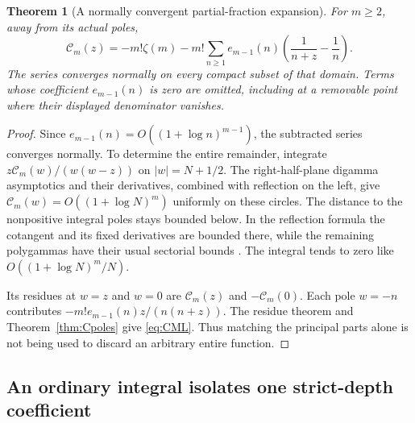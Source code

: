 \documentclass[11pt,a4paper]{article}
\numberwithin{equation}{section}
\newtheorem{theorem}{Theorem}[section]
\theoremstyle{definition}
\newcommand{\CM}{\mathcal C}
\begin{document}
\begin{theorem}[A normally convergent partial-fraction expansion]
\label{thm:CML}
For $m\ge2$, away from its actual poles,
\begin{equation}\label{eq:CML}
 \boxed{\displaystyle
 \CM_m(z)=-m!\zeta(m)-m!\sum_{n\ge1}e_{m-1}(n)
       \left(\frac1{n+z}-\frac1n\right).}
\end{equation}
The series converges normally on every compact subset of that domain.
Terms whose coefficient $e_{m-1}(n)$ is zero are omitted, including
at a removable point where their displayed denominator vanishes.
\end{theorem}
\begin{proof}
Since $e_{m-1}(n)=O((1+\log n)^{m-1})$, the subtracted series
converges normally. To determine the entire remainder, integrate
$z\CM_m(w)/(w(w-z))$ on $|w|=N+1/2$. The right-half-plane
digamma asymptotics and their derivatives, combined with reflection
on the left, give $\CM_m(w)=O((1+\log N)^m)$ uniformly on these
circles. The distance to the nonpositive integral poles stays bounded
below. In the reflection formula the cotangent and its fixed
derivatives are bounded there, while the remaining polygammas have
their usual sectorial bounds \cite{DLMF}. The integral tends to zero
like $O((1+\log N)^m/N)$.

Its residues at $w=z$ and $w=0$ are $\CM_m(z)$ and
$-\CM_m(0)$. Each pole $w=-n$ contributes
$-m!e_{m-1}(n)z/(n(n+z))$. The residue theorem and
Theorem~\ref{thm:Cpoles} give \eqref{eq:CML}. Thus matching the
principal parts alone is not being used to discard an arbitrary
entire function.
\end{proof}

\subsection{An ordinary integral isolates one strict-depth coefficient}
\end{document}
